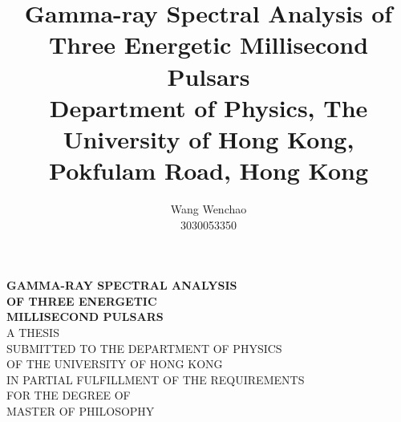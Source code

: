 \documentclass[a4paper, 12pt]{report}
\title{\textbf{Gamma-ray Spectral Analysis of Three Energetic Millisecond Pulsars} \\ \vspace{1cm}
  {\large Department of Physics, The University of Hong Kong, Pokfulam Road, Hong Kong}}
\date{}
\author{Wang Wenchao  \\3030053350}
\begin{document}
\begin{titlepage}
  \begin{center}
  \vspace*{3cm}
  \Large \textbf{GAMMA-RAY SPECTRAL ANALYSIS 
    \\[0.5cm] OF THREE ENERGETIC \\ [0.5cm] 
    MILLISECOND PULSARS \\[3.7cm]}
  \small
    A THESIS \\[0.5cm] 
    SUBMITTED TO THE DEPARTMENT OF PHYSICS \\[0.5cm]
    OF THE UNIVERSITY OF HONG KONG \\[0.5cm]
    IN PARTIAL FULFILLMENT OF THE REQUIREMENTS \\[0.5cm]
    FOR THE DEGREE OF \\[0.5cm]
    MASTER OF PHILOSOPHY \\[4.2cm]


\end{center}
\end{titlepage}
\end{document}
